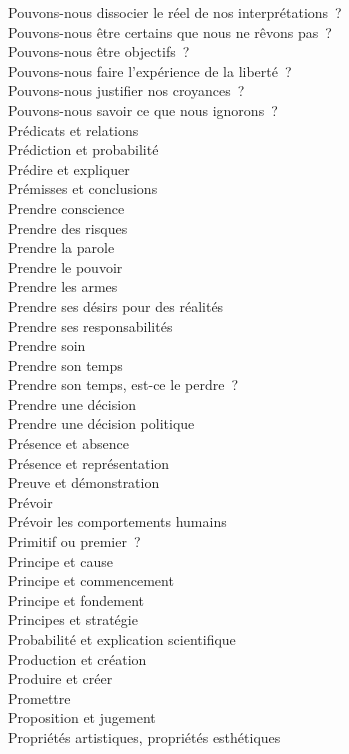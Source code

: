 \documentclass[a4paper,12pt]{article}
\begin{document}
Pouvons-nous dissocier le réel de nos interprétations ? \\
Pouvons-nous être certains que nous ne rêvons pas ? \\
Pouvons-nous être objectifs ? \\
Pouvons-nous faire l'expérience de la liberté ? \\
Pouvons-nous justifier nos croyances ? \\
Pouvons-nous savoir ce que nous ignorons ? \\
Prédicats et relations \\
Prédiction et probabilité \\
Prédire et expliquer \\
Prémisses et conclusions \\
Prendre conscience \\
Prendre des risques \\
Prendre la parole \\
Prendre le pouvoir \\
Prendre les armes \\
Prendre ses désirs pour des réalités \\
Prendre ses responsabilités \\
Prendre soin \\
Prendre son temps \\
Prendre son temps, est-ce le perdre ? \\
Prendre une décision \\
Prendre une décision politique \\
Présence et absence \\
Présence et représentation \\
Preuve et démonstration \\
Prévoir \\
Prévoir les comportements humains \\
Primitif ou premier ? \\
Principe et cause \\
Principe et commencement \\
Principe et fondement \\
Principes et stratégie \\
Probabilité et explication scientifique \\
Production et création \\
Produire et créer \\
Promettre \\
Proposition et jugement \\
Propriétés artistiques, propriétés esthétiques \\
\end{document}
